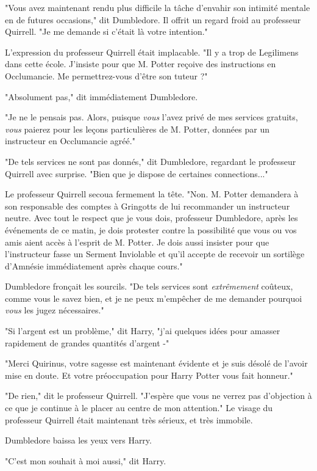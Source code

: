 "Vous avez maintenant rendu plus difficile la tâche d'envahir son intimité mentale en de futures occasions," dit Dumbledore. Il offrit un regard froid au professeur Quirrell. "Je me demande si c'était là votre intention."

L'expression du professeur Quirrell était implacable. "Il y a trop de Legilimens dans cette école. J'insiste pour que M. Potter reçoive des instructions en Occlumancie. Me permettrez-vous d'être son tuteur ?"

"Absolument pas," dit immédiatement Dumbledore.

"Je ne le pensais pas. Alors, puisque \emph{vous}  l'avez privé de mes services gratuits, \emph{vous}  paierez pour les leçons particulières de M. Potter, données par un instructeur en Occlumancie agréé."

"De tels services ne sont pas donnés," dit Dumbledore, regardant le professeur Quirrell avec surprise. "Bien que je dispose de certaines connections..."

Le professeur Quirrell secoua fermement la tête. "Non. M. Potter demandera à son responsable des comptes à Gringotts de lui recommander un instructeur neutre. Avec tout le respect que je vous dois, professeur Dumbledore, après les événements de ce matin, je dois protester contre la possibilité que vous ou vos amis aient accès à l'esprit de M. Potter. Je dois aussi insister pour que l'instructeur fasse un Serment Inviolable et qu'il accepte de recevoir un sortilège d'Amnésie immédiatement après chaque cours."

Dumbledore fronçait les sourcils. "De tels services sont \emph{extrêmement}  coûteux, comme vous le savez bien, et je ne peux m'empêcher de me demander pourquoi \emph{vous}  les jugez nécessaires."

"Si l'argent est un problème," dit Harry, "j'ai quelques idées pour amasser rapidement de grandes quantités d'argent -"

"Merci Quirinus, votre sagesse est maintenant évidente et je suis désolé de l'avoir mise en doute. Et votre préoccupation pour Harry Potter vous fait honneur."

"De rien," dit le professeur Quirrell. "J'espère que vous ne verrez pas d'objection à ce que je continue à le placer au centre de mon attention." Le visage du professeur Quirrell était maintenant très sérieux, et très immobile.

Dumbledore baissa les yeux vers Harry.

"C'est mon souhait à moi aussi," dit Harry.

